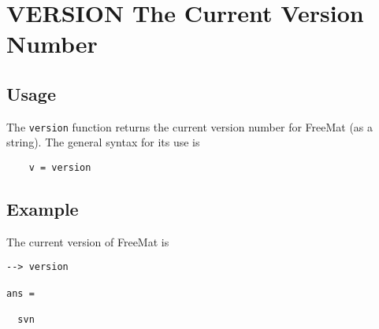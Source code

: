 \section{VERSION The Current Version Number}

\subsection{Usage}

The \verb|version| function returns the current version number for
FreeMat (as a string).  The general syntax for its use is
\begin{verbatim}
    v = version
\end{verbatim}
\subsection{Example}

The current version of FreeMat is
\begin{verbatim}
--> version

ans = 

  svn
\end{verbatim}
